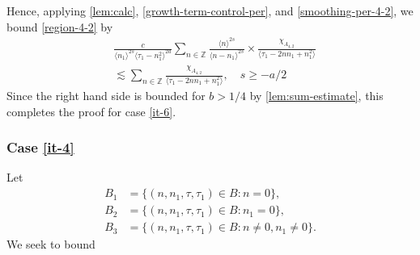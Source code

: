 \documentclass[12pt,reqno]{amsart}
\numberwithin{equation}{section}  %
\numberwithin{figure}{section}
\newcommand{\zz}{\mathbb{Z}}
\theoremstyle{plain}
\theoremstyle{definition}
\theoremstyle{remark}
\begin{document}
Hence, applying
\autoref{lem:calc}, \eqref{growth-term-control-per}, and
\eqref{smoothing-per-4-2}, we bound \eqref{region-4-2} by
%
%
\begin{equation*}
\begin{split}
&  \frac{c}{\langle n_{1} \rangle ^{2s}
  \langle \tau_{1} - n_{1}^{2} \rangle
  ^{2a}} \sum_{n \in \zz} \frac{\langle n \rangle ^{2s}}{\langle
  n - n_{1}\rangle ^{2s}}  \times \frac{\chi_{A_{4,2}}}{\langle
  \tau_{1} - 2nn_{1} + n_{1}^{2} \rangle } 
  \\
  & \lesssim 
  \sum_{n \in \zz} \frac{\chi_{A_{4,2}}}{\langle
  \tau_{1} - 2nn_{1} + n_{1}^{2} \rangle },
  \quad  s \ge -a/2
  \end{split}
\end{equation*}
%
%
Since the right hand side is bounded for $b > 1/4$ by \autoref{lem:sum-estimate}, this
completes the proof for case \eqref{it-6}.
\subsubsection{Case \eqref{it-4}} 
\label{sssec:case-it-4}
Let 
%
%
\begin{align*}
B_1&=\{(n, n_1, \tau, \tau_1)\in B: n=0\},\\
B_2&=\{(n, n_1, \tau, \tau_1)\in B: n_1 = 0 \},\\
B_3&=\{(n, n_1, \tau, \tau_1)\in B: n \neq 0, n_1 \neq 0 \}.
\end{align*} 
%
%
We seek to bound
\end{document}
